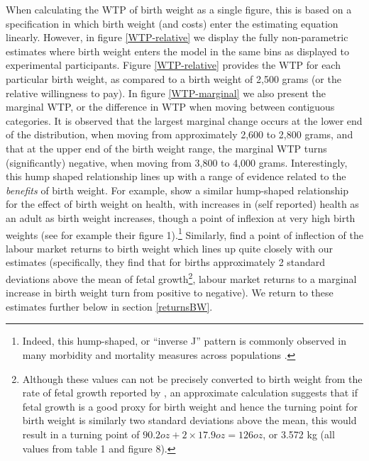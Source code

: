 \documentclass[a4paper, 11pt]{article}
\begin{document}
\begin{spacing}{1.4}
When calculating the WTP of birth weight as a single figure, this is
based on a specification in which birth weight (and costs) enter the
estimating equation linearly.  However, in figure \ref{WTP-relative} we
display the fully non-parametric estimates where birth weight enters
the model in the same bins as displayed to experimental participants.
Figure \ref{WTP-relative} provides the WTP for each particular birth
weight, as compared to a birth weight of 2,500 grams (or the relative
willingness to pay).  In figure \ref{WTP-marginal} we also present the
marginal WTP, or the difference in WTP when moving between contiguous
categories.  It is observed that the largest marginal change occurs
at the lower end of the distribution, when moving from approximately
2,600 to 2,800 grams, and that at the upper end of the birth weight
range, the marginal WTP turns (significantly) negative, when moving
from 3,800 to 4,000 grams.  Interestingly, this hump shaped relationship
lines up with a range of evidence related to the \emph{benefits} of
birth weight.  For example, \citet{Caseetal2005} show a similar
hump-shaped relationship for the effect of birth weight on health,
with increases in (self reported) health as an adult as birth weight
increases, though a point of inflexion at very high birth weights
(see for example their figure 1).\footnote{Indeed, this hump-shaped,
  or ``inverse J'' pattern is commonly observed in many morbidity and
  mortality measures across populations \citep{Wilcox2001}.} Similarly,
\citet{BehrmanRosenzweig2004}
find a point of inflection of the labour market returns to birth weight
which lines up quite closely with our estimates (specifically, they
find that for births approximately 2 standard deviations above the mean
of fetal growth\footnote{Although these values can not be precisely
  converted to birth weight from the rate of fetal growth reported by
  \citet{BehrmanRosenzweig2004}, an approximate calculation suggests
  that if fetal growth is a good proxy for birth weight and hence the
  turning point for birth weight is similarly two standard deviations
  above the mean, this would result in a turning point of
  $90.2 oz + 2\times 17.9 oz = 126 oz$, or 3.572 kg (all values from
  \citet{BehrmanRosenzweig2004} table 1 and figure 8).}, labour market
returns to a marginal increase in birth weight turn from positive to
negative). We return to these estimates further below in section
\ref{returnsBW}.  


\end{spacing}
\end{document}
